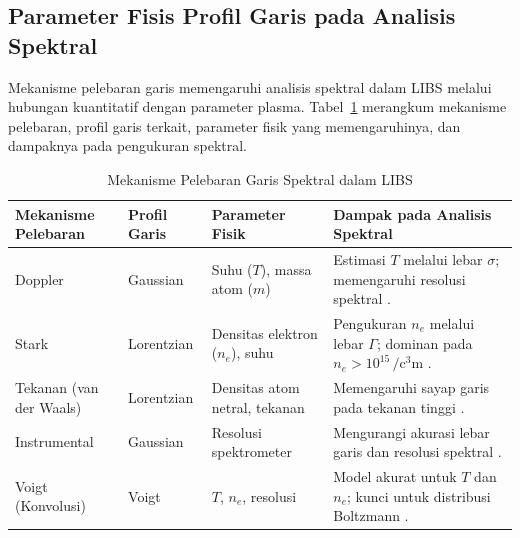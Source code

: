 \subsection{Parameter Fisis Profil Garis pada Analisis Spektral}
Mekanisme pelebaran garis memengaruhi analisis spektral dalam LIBS melalui hubungan kuantitatif dengan parameter plasma. Tabel~\ref{tab:broadening_effects} merangkum mekanisme pelebaran, profil garis terkait, parameter fisik yang memengaruhinya, dan dampaknya pada pengukuran spektral.

\begin{table}[h]
\centering
\caption{Mekanisme Pelebaran Garis Spektral dalam LIBS}
\label{tab:broadening_effects}
\begin{tabularx}{\textwidth}{XXXX}
\toprule
\textbf{Mekanisme Pelebaran} & \textbf{Profil Garis} & \textbf{Parameter Fisik} & \textbf{Dampak pada Analisis Spektral} \\
\midrule
Doppler & Gaussian & Suhu (\( T \)), massa atom (\( m \)) & Estimasi \( T \) melalui lebar \( \sigma \); memengaruhi resolusi spektral \citep{Demtroder2010}. \\
Stark & Lorentzian & Densitas elektron (\( n_e \)), suhu & Pengukuran \( n_e \) melalui lebar \( \Gamma \); dominan pada \( n_e > 10^{15} \, \si{\per\cubic\centi\meter} \) \citep{Konjevic1999}. \\
Tekanan (van der Waals) & Lorentzian & Densitas atom netral, tekanan & Memengaruhi sayap garis pada tekanan tinggi \citep{Konjevic1999}. \\
Instrumental & Gaussian & Resolusi spektrometer & Mengurangi akurasi lebar garis dan resolusi spektral \citep{Miziolek2006}. \\
Voigt (Konvolusi) & Voigt & \( T \), \( n_e \), resolusi & Model akurat untuk \( T \) dan \( n_e \); kunci untuk distribusi Boltzmann \citep{Aragon2008}. \\
\bottomrule
\end{tabularx}
\end{table}

